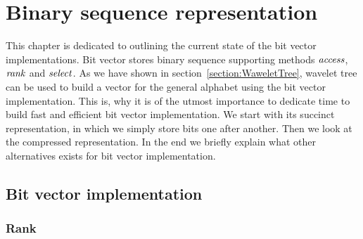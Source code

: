 \chapter{Binary sequence representation}
\label{kap:kap2}

This chapter is dedicated to outlining the current state of the bit vector
implementations. Bit vector stores binary sequence supporting methods $\mathit{access}$,
$\mathit{rank}$ and $\mathit{select}$. As we have shown in section~\ref{section:WaweletTree}, wavelet
tree can be used to build a vector for the general alphabet using the bit vector
implementation. This is, why it is of the utmost importance to dedicate time
to build fast and efficient bit vector implementation. We start with its
succinct representation, in which we simply store bits one after another. Then we
look at the compressed representation. In the end we briefly explain what other
alternatives exists for bit vector implementation.

\section{Bit vector implementation}

\subsection{Rank}
\label{section:rank}

